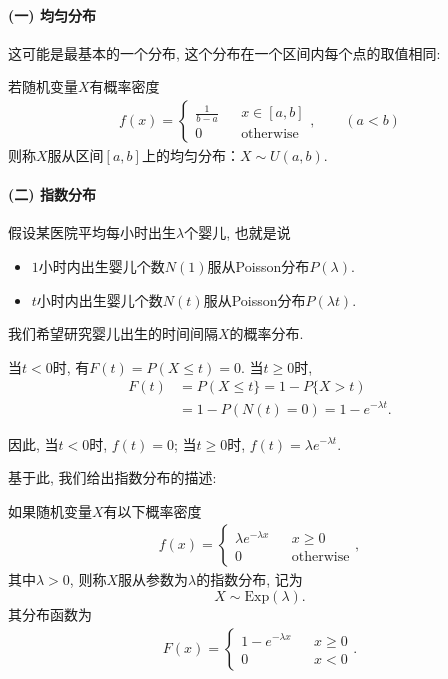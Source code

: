 \paragraph{(一) 均匀分布}

这可能是最基本的一个分布, 这个分布在一个区间内每个点的取值相同:

\begin{definition}
    若随机变量$X$有概率密度
    \begin{align*}
        f(x)=\left\{\begin{array}{lcl}
                        \frac1{b-a} &  & x\in [a,b]       \\
                        0           &  & \mbox{otherwise}
                    \end{array}\right. ,\qquad (a<b)
    \end{align*}
    则称$X$服从区间$[a,b]$上的均匀分布：$X\sim U(a,b)$.
\end{definition}%


\paragraph{(二) 指数分布}

假设某医院平均每小时出生$\lambda$个婴儿, 也就是说
\begin{itemize}
    \item $1$小时内出生婴儿个数$N(1)$服从Poisson分布$P(\lambda)$. 
    \item $t$小时内出生婴儿个数$N(t)$服从Poisson分布$P(\lambda t)$. 
\end{itemize}
我们希望研究婴儿出生的时间间隔$X$的概率分布. 


当$t<0$时, 有$F(t)=P(X\le t)=0$.  当$t\ge0$时, 
\begin{align*}
    F(t) & =P(X\le t\}=1-P\{X>t)          \\
         & =1-P(N(t)=0)=1-e^{-\lambda t}.
\end{align*}

因此, 当$t<0$时, $f(t)=0$;  当$t\ge0$时, $f(t)=\lambda e^{-\lambda t}$. 

基于此, 我们给出指数分布的描述:
\begin{definition}
    如果随机变量$X$有以下概率密度
    \begin{align*}
        f(x)=\left\{\begin{array}{lcl}
                        \lambda e^{-\lambda x} &  & x\ge 0           \\
                        0                      &  & \mbox{otherwise}
                    \end{array}\right. ,
    \end{align*}
    其中$\lambda>0$, 则称$X$服从参数为$\lambda$的指数分布, 记为
    \[X\sim \text{Exp}(\lambda). \]
    其分布函数为
    \begin{align*}
        F(x)=\left\{\begin{array}{lcl}
                        1- e^{-\lambda x} &  & x\ge 0 \\
                        0                 &  & x<0
                    \end{array}\right. .
    \end{align*}
\end{definition}

